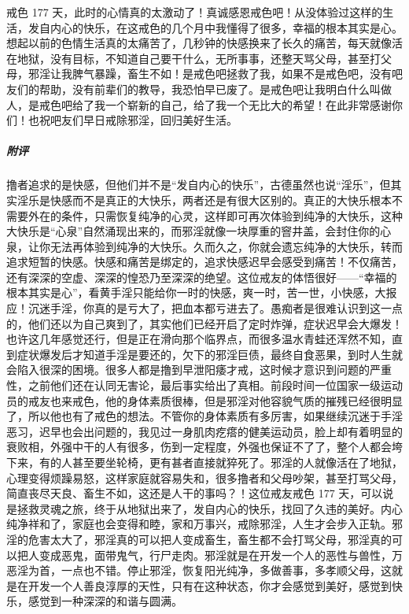 \begin{case}
    戒色 177 天，此时的心情真的太激动了！真诚感恩戒色吧！从没体验过这样的生活，发自内心的快乐，在这戒色的几个月中我懂得了很多，幸福的根本其实是心。想起以前的色情生活真的太痛苦了，几秒钟的快感换来了长久的痛苦，每天就像活在地狱，没有目标，不知道自己要干什么，无所事事，还整天骂父母，甚至打父母，邪淫让我脾气暴躁，畜生不如！是戒色吧拯救了我，如果不是戒色吧，没有吧友们的帮助，没有前辈们的教导，我恐怕早已废了。是戒色吧让我明白什么叫做人，是戒色吧给了我一个崭新的自己，给了我一个无比大的希望！在此非常感谢你们！也祝吧友们早日戒除邪淫，回归美好生活。
    \subparagraph{附评} 撸者追求的是快感，但他们并不是“发自内心的快乐”，古德虽然也说“淫乐”，但其实淫乐是快感而不是真正的大快乐，两者还是有很大区别的。真正的大快乐根本不需要外在的条件，只需恢复纯净的心灵，这样即可再次体验到纯净的大快乐，这种大快乐是“心泉”自然涌现出来的，而邪淫就像一块厚重的窨井盖，会封住你的心泉，让你无法再体验到纯净的大快乐。久而久之，你就会遗忘纯净的大快乐，转而追求短暂的快感。快感和痛苦是绑定的，追求快感迟早会感受到痛苦！不仅痛苦，还有深深的空虚、深深的惶恐乃至深深的绝望。这位戒友的体悟很好——“幸福的根本其实是心”，看黄手淫只能给你一时的快感，爽一时，苦一世，小快感，大报应！沉迷手淫，你真的是亏大了，把血本都亏进去了。愚痴者是很难认识到这一点的，他们还以为自己爽到了，其实他们已经开启了定时炸弹，症状迟早会大爆发！也许这几年感觉还行，但是正在滑向那个临界点，而很多温水青蛙还浑然不知，直到症状爆发后才知道手淫是要还的，欠下的邪淫巨债，最终自食恶果，到时人生就会陷入很深的困境。很多人都是撸到早泄阳痿才戒，这时候才意识到问题的严重性，之前他们还在认同无害论，最后事实给出了真相。前段时间一位国家一级运动员的戒友也来戒色，他的身体素质很棒，但是邪淫对他容貌气质的摧残已经很明显了，所以他也有了戒色的想法。不管你的身体素质有多厉害，如果继续沉迷于手淫恶习，迟早也会出问题的，我见过一身肌肉疙瘩的健美运动员，脸上却有着明显的衰败相，外强中干的人有很多，伤到一定程度，外强也保证不了了，整个人都会垮下来，有的人甚至要坐轮椅，更有甚者直接就猝死了。邪淫的人就像活在了地狱，心理变得烦躁易怒，这样家庭就容易失和，很多撸者和父母吵架，甚至打骂父母，简直丧尽天良、畜生不如，这还是人干的事吗？！这位戒友戒色 177 天，可以说是拯救灵魂之旅，终于从地狱出来了，发自内心的快乐，找回了久违的美好。内心纯净祥和了，家庭也会变得和睦，家和万事兴，戒除邪淫，人生才会步入正轨。邪淫的危害太大了，邪淫真的可以把人变成畜生，畜生都不会打骂父母，邪淫真的可以把人变成恶鬼，面带鬼气，行尸走肉。邪淫就是在开发一个人的恶性与兽性，万恶淫为首，一点也不错。停止邪淫，恢复阳光纯净，多做善事，多孝顺父母，这就是在开发一个人善良淳厚的天性，只有在这种状态，你才会感觉到美好，感觉到快乐，感觉到一种深深的和谐与圆满。
\end{case}

